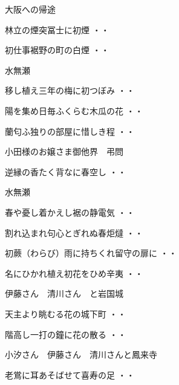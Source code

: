 大阪への帰途
\begin{shiika}林立の煙突冨士に初煙
\hfill{・・}\end{shiika}
\begin{shiika}初仕事裾野の町の白煙
\hfill{・・}\end{shiika}
\vspace{ 0.4cm}
水無瀬
\begin{shiika}移し植え三年の梅に初つぼみ
\hfill{・・}\end{shiika}
\begin{shiika}陽を集め日毎ふくらむ木瓜の花
\hfill{・・}\end{shiika}
\begin{shiika}蘭匂ふ独りの部屋に惜しき程
\hfill{・・}\end{shiika}
\vspace{ 0.4cm}
小田様のお嬢さま御他界　弔問
\begin{shiika}逆縁の香たく背なに春空し
\hfill{・・}\end{shiika}
\vspace{ 0.4cm}
水無瀬
\begin{shiika}春や憂し着かえし裾の静電気
\hfill{・・}\end{shiika}
\begin{shiika}割れ込まれ句心とぎれぬ春炬燵
\hfill{・・}\end{shiika}
\begin{shiika}初蕨（わらび）雨に持ちくれ留守の扉に
\hfill{・・}\end{shiika}
\begin{shiika}名にひかれ植え初花をひめ辛夷
\hfill{・・}\end{shiika}
\vspace{ 0.4cm}
伊藤さん　清川さん　と岩国城
\begin{shiika}天主より眺むる花の城下町
\hfill{・・}\end{shiika}
\begin{shiika}階高し一打の鐘に花の散る
\hfill{・・}\end{shiika}
\vspace{ 0.4cm}
小汐さん　伊藤さん　清川さんと鳳来寺
\begin{shiika}老鴬に耳あそばせて喜寿の足
\hfill{・・}\end{shiika}
